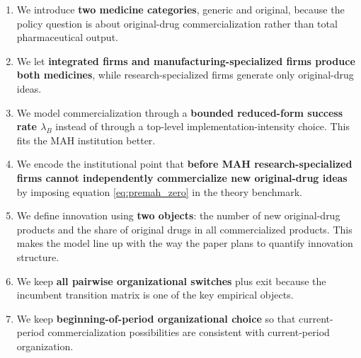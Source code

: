 \documentclass[12pt]{article}
\newcommand{\1}{\mathbf{1}}
\begin{document}
\begin{enumerate}[leftmargin=2em]
    \item We introduce \textbf{two medicine categories}, generic and original, because the policy question is about original-drug commercialization rather than total pharmaceutical output.
    \item We let \textbf{integrated firms and manufacturing-specialized firms produce both medicines}, while research-specialized firms generate only original-drug ideas.
    \item We model commercialization through a \textbf{bounded reduced-form success rate $\lambda_B$} instead of through a top-level implementation-intensity choice. This fits the MAH institution better.
    \item We encode the institutional point that \textbf{before MAH research-specialized firms cannot independently commercialize new original-drug ideas} by imposing equation \eqref{eq:premah_zero} in the theory benchmark.
    \item We define innovation using \textbf{two objects}: the number of new original-drug products and the share of original drugs in all commercialized products. This makes the model line up with the way the paper plans to quantify innovation structure.
    \item We keep \textbf{all pairwise organizational switches} plus exit because the incumbent transition matrix is one of the key empirical objects.
    \item We keep \textbf{beginning-of-period organizational choice} so that current-period commercialization possibilities are consistent with current-period organization.
\end{enumerate}
\end{document}
